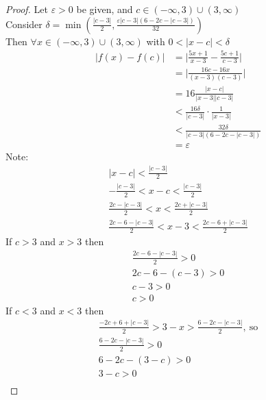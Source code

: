 \documentclass[12pt]{article}
\begin{document}
\begin{enumerate}
\begin{enumerate}
\begin{proof}
                  Let $\varepsilon > 0$ be given, and $c \in (-\infty, 3) \cup (3, \infty)$ \\
                  Consider $\delta = \min(\frac{|c-3|}{2}, \frac{\varepsilon|c-3|(6-2c-|c-3|)}{32})$ \\
                  Then $\forall x \in (-\infty, 3) \cup (3, \infty)$ with $0 < |x-c| < \delta$
                  \begin{align*}
                      |f(x) - f(c)| &= \bigg| \frac{5x+1}{x-3} - \frac{5c+1}{c-3} \bigg| \\
                      &= \bigg| \frac{16c-16x}{(x-3)(c-3)} \bigg| \\
                      &= 16\frac{|x-c|}{|x-3||c-3|} \\
                      &< \frac{16\delta}{|c-3|} \cdot \frac{1}{|x-3|} \\
                      &< \frac{32\delta}{|c-3|(6-2c-|c-3|)} \\                      
                      &= \varepsilon
                  \end{align*}
                  Note:
                  \begin{gather*}
                      |x-c| < \frac{|c-3|}{2} \\
                      -\frac{|c-3|}{2} < x-c < \frac{|c-3|}{2} \\
                      \frac{2c-|c-3|}{2} < x < \frac{2c+|c-3|}{2} \\
                      \frac{2c-6-|c-3|}{2} < x-3 < \frac{2c-6+|c-3|}{2}
                  \end{gather*}
                  If $c > 3$ and $x > 3$ then
                  \begin{gather*}
                      \frac{2c-6-|c-3|}{2} > 0 \\
                      2c-6-(c-3) > 0 \\
                      c-3 > 0 \\
                      c > 0
                  \end{gather*}
                  If $c < 3$ and $x < 3$ then
                  \begin{gather*}
                    \frac{-2c+6+|c-3|}{2} > 3-x > \frac{6-2c-|c-3|}{2}, \ \text{so} \\
                    \frac{6-2c-|c-3|}{2} > 0 \\
                    6-2c-(3-c) > 0 \\
                    3-c > 0 \\

\end{gather*}
\end{proof}
\end{enumerate}
\end{enumerate}
\end{document}
